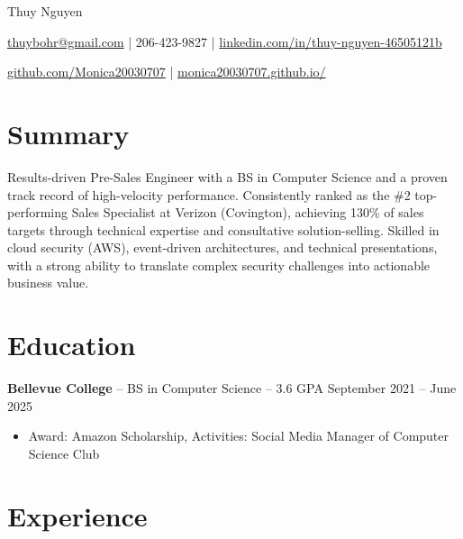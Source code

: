 \documentclass[11pt]{article}       %
\begin{document}
\centerline{\Huge Thuy Nguyen}

\vspace{5pt}

\centerline{\href{mailto:thuybohr@gmail.com}{thuybohr@gmail.com} | 206-423-9827 |
\href{https://www.linkedin.com/in/thuy-nguyen-46505121b/}{linkedin.com/in/thuy-nguyen-46505121b}}

\centerline{\href{https://github.com/Monica20030707}{github.com/Monica20030707} | 
\href{https://monica20030707.github.io/}{monica20030707.github.io/}} 

\vspace{-9pt}

\section*{Summary}
Results-driven Pre-Sales Engineer with a BS in Computer Science and a proven track record of high-velocity performance. Consistently ranked as the \#2 top-performing Sales Specialist at Verizon (Covington), achieving 130\% of sales targets through technical expertise and consultative solution-selling. Skilled in cloud security (AWS), event-driven architectures, and technical presentations, with a strong ability to translate complex security challenges into actionable business value.

\vspace{-10pt}

\section*{Education}
\textbf{Bellevue College} -- BS in Computer Science -- 3.6 GPA \hfill September 2021 -- June 2025\\
\vspace{-9pt}
\begin{itemize}
  \item Award: Amazon Scholarship, Activities: Social Media Manager of Computer Science Club
\end{itemize}

\vspace{-18.5pt}

\section*{Experience}
\end{document}
